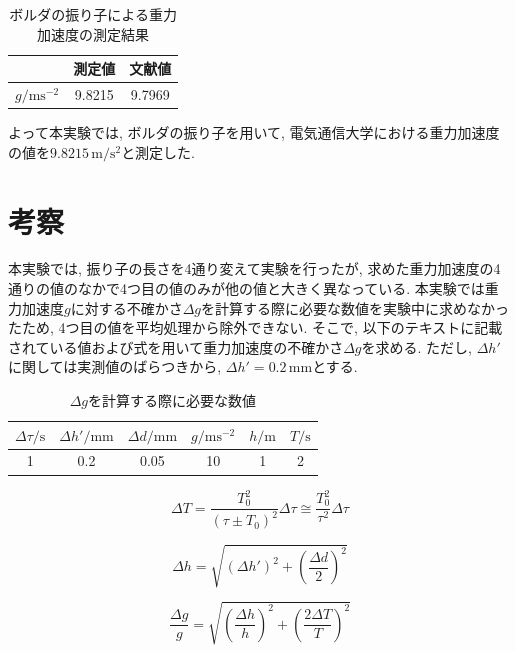\documentclass{jarticle}
\begin{document}
\begin{table}[h]
  \centering
  \caption{ボルダの振り子による重力加速度の測定結果}
  \begin{tabular}{ccc}
    \hline
    & 測定値 & 文献値 \\
    \hline
    $g/\mathrm{ms^{-2}}$ & 9.8215 & 9.7969 \\
    \hline
  \end{tabular}
\end{table}

よって本実験では, ボルダの振り子を用いて, 電気通信大学における重力加速度の値を$9.8215\,\mathrm{m/s^2}$と測定した.


\section{考察}


本実験では, 振り子の長さを4通り変えて実験を行ったが, 求めた重力加速度の4通りの値のなかで4つ目の値のみが他の値と大きく異なっている.
本実験では重力加速度$g$に対する不確かさ$\Delta g$を計算する際に必要な数値を実験中に求めなかったため, 4つ目の値を平均処理から除外できない.
そこで, 以下のテキストに記載されている値および式を用いて重力加速度の不確かさ$\Delta g$を求める. ただし, $\Delta h'$に関しては実測値のばらつきから, $\Delta h'=0.2\,\mathrm{mm}$とする.

\begin{table}[h]
  \centering
  \caption{$\Delta g$を計算する際に必要な数値}
  \begin{tabular}{cccccc}
    \hline
    $\Delta\tau/\mathrm{s}$ & $\Delta h'/\mathrm{mm}$ & $\Delta d/\mathrm{mm}$ & $g/\mathrm{ms^{-2}}$ & $h/\mathrm{m}$ & $T/\mathrm{s}$ \\
    \hline
    1 & 0.2 & 0.05 & 10 & 1 & 2 \\
    \hline
  \end{tabular}
\end{table}


\begin{equation}
  \Delta T=\frac{T_0^2}{(\tau\pm T_0)^2}\Delta\tau\cong\frac{T_0^2}{\tau^2}\Delta\tau
\end{equation}

\begin{equation}
  \Delta h=\sqrt{(\Delta h')^2+\left(\frac{\Delta d}{2}\right)^2}
\end{equation}

\begin{equation}
  \frac{\Delta g}{g}=\sqrt{\left(\frac{\Delta h}{h}\right)^2+\left(\frac{2\Delta T}{T}\right)^2}
\end{equation}
\end{document}
